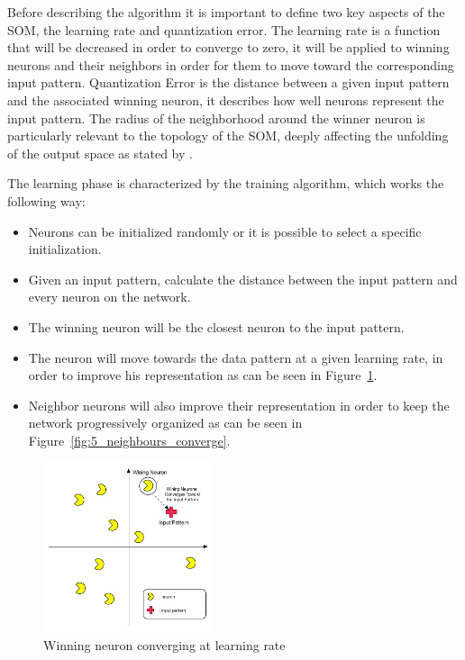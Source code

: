 Before describing the algorithm it is important to define two key aspects of the SOM, the learning rate and quantization error. The learning rate is a function that will be decreased in order to converge to zero, it will be applied to winning neurons and their neighbors in order for them to move toward the corresponding input pattern. Quantization Error is the distance between a given input pattern and the associated winning neuron, it describes how well neurons represent the input pattern. The radius of the neighborhood around the winner neuron is particularly relevant to the topology of the SOM, deeply affecting the unfolding of the output space as stated by \citep{Bacao2005}.
\par
The learning phase is characterized by the training algorithm, which works the following way:
\begin{itemize}
  \item Neurons can be initialized randomly or it is possible to select a specific initialization.
  \item Given an input pattern, calculate the distance between the input pattern and every neuron on the network.
  \item The winning neuron will be the closest neuron to the input pattern.
  \item The neuron will move towards the data pattern at a given learning rate, in order to improve his representation as can be seen in Figure~\ref{fig:4_wining_neuron_converge}.
  \item Neighbor neurons will also improve their representation in order to keep the network progressively organized as can be seen in Figure~\ref{fig:5_neighbours_converge}.
\end{itemize}

\begin{figure}
  \begin{center}
    \includegraphics[width=5cm]{images/4_wining_neuron_converge.jpg}
  \end{center}
  \caption{ Winning neuron converging at learning rate }
  \label{fig:4_wining_neuron_converge}
\end{figure}

